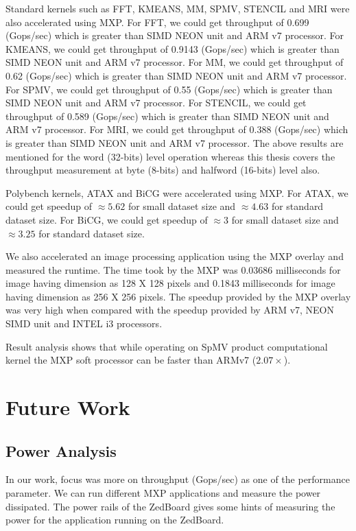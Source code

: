 Standard kernels such as FFT, KMEANS, MM, SPMV, STENCIL and MRI were also accelerated using MXP. For FFT, we could get throughput of 0.699 (Gops/sec) which is greater than SIMD NEON unit and ARM v7 processor. For KMEANS, we could get throughput of 0.9143 (Gops/sec) which is greater than SIMD NEON unit and ARM v7 processor. For MM, we could get throughput of 0.62 (Gops/sec) which is greater than SIMD NEON unit and ARM v7 processor. For SPMV, we could get throughput of 0.55 (Gops/sec) which is greater than SIMD NEON unit and ARM v7 processor. For STENCIL, we could get throughput of 0.589 (Gops/sec) which is greater than SIMD NEON unit and ARM v7 processor. For MRI, we could get throughput of 0.388 (Gops/sec) which is greater than SIMD NEON unit and ARM v7 processor. The above results are mentioned for the word (32-bits) level operation whereas this thesis covers the throughput measurement at byte (8-bits) and halfword (16-bits) level also.



Polybench kernels, ATAX and BiCG were accelerated using MXP. For ATAX, we could get speedup of ${\approx}5.62$ for small dataset size and ${\approx}4.63$ for standard dataset size. For BiCG, we could get speedup of ${\approx}3$ for small dataset size and ${\approx}3.25$ for standard dataset size.



We also accelerated an image processing application using the MXP overlay and measured the runtime. The time took by the MXP was 0.03686 milliseconds for image having dimension as 128 X 128 pixels and 0.1843 milliseconds for image having dimension as 256 X 256 pixels. The speedup provided by the MXP overlay was very high when compared with the speedup provided by ARM v7, NEON SIMD unit and INTEL i3 processors.

Result analysis shows that while operating on SpMV product computational kernel the MXP soft processor can be faster than ARMv7 ($2.07\times$).



\section{Future Work}

\subsection{Power Analysis}
In our work, focus was more on throughput (Gops/sec) as one of the performance parameter. We can run different MXP applications and measure the power dissipated. The power rails of the ZedBoard gives some hints of measuring the power for the application running on the ZedBoard. 

